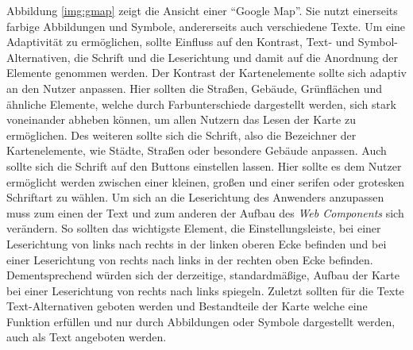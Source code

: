 \documentclass[12pt, paper=a4, bibtotoc, toc=listof, headsepline=true]{scrreprt}
\begin{document}
			Abbildung \ref{img:gmap} zeigt die Ansicht einer \enquote{Google Map}. Sie nutzt einerseits farbige Abbildungen und Symbole, andererseits auch verschiedene Texte. Um eine Adaptivität zu ermöglichen, sollte Einfluss auf den Kontrast, Text- und Symbol-Alternativen, die Schrift und die Leserichtung und damit auf die Anordnung der Elemente genommen werden. Der Kontrast der Kartenelemente sollte sich adaptiv an den Nutzer anpassen. Hier sollten die Straßen, Gebäude, Grünflächen und ähnliche Elemente, welche durch Farbunterschiede dargestellt werden, sich stark voneinander abheben können, um allen Nutzern das Lesen der Karte zu ermöglichen. Des weiteren sollte sich die Schrift, also die Bezeichner der Kartenelemente, wie Städte, Straßen oder besondere Gebäude anpassen. Auch sollte sich die Schrift auf den Buttons einstellen lassen. Hier sollte es dem Nutzer ermöglicht werden zwischen einer kleinen, großen und einer serifen oder grotesken Schriftart zu wählen. Um sich an die Leserichtung des Anwenders anzupassen muss zum einen der Text und zum anderen der Aufbau des \emph{Web Components} sich verändern. So sollten das wichtigste Element, die Einstellungsleiste, bei einer Leserichtung von links nach rechts in der linken oberen Ecke befinden und bei einer Leserichtung von rechts nach links in der rechten oben Ecke befinden. Dementsprechend würden sich der derzeitige, standardmäßige, Aufbau der Karte bei einer Leserichtung von rechts nach links spiegeln. Zuletzt sollten für die Texte Text-Alternativen geboten werden und Bestandteile der Karte welche eine Funktion erfüllen und nur durch Abbildungen oder Symbole dargestellt werden, auch als Text angeboten werden. 
\end{document}
